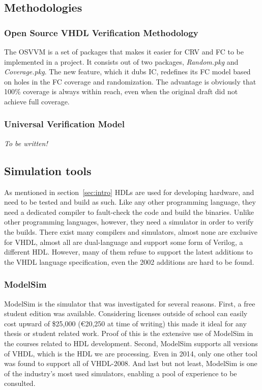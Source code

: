 \documentclass[11pt,british]{article}
\begin{document}
\subsection{Methodologies}

\subsubsection{Open Source VHDL Verification Methodology}
The \gls{OSVVM} is a set of packages that makes it easier for \gls{CRV} and \gls{FC} to be implemented in a project. It consists out of two packages, \emph{Random.pkg} and \emph{Coverage.pkg}. The new feature, which it dubs \gls{IC}, redefines its FC model based on holes in the FC coverage and randomization. The advantage is obviously that 100\% coverage is always within reach, even when the original draft did not achieve full coverage.\cite{ICoverage}

\subsubsection{Universal Verification Model}
\emph{\color{red} To be written!}

\subsection{Simulation tools}
As mentioned in section~\ref{sec:intro} \gls{HDL}s are used for developing hardware, and need to be tested and build as such. Like any other programming language, they need a dedicated compiler to fault-check the code and build the binaries. Unlike other programming languages, however, they need a simulator in order to verify the builds. There exist many compilers and simulators, almost none are exclusive for \gls{VHDL}, almost all are dual-language and support some form of Verilog, a different HDL. However, many of them refuse to support the latest additions to the VHDL language specification, even the 2002 additions are hard to be found.

\label{subsec:simtool}
\subsubsection{ModelSim}
ModelSim is the simulator that was investigated for several reasons. First, a free student edition was available. Considering licenses  outside of school can easily cost upward of \$25,000 (\euro20,250 at time of writing) this made it ideal for any thesis or student related work. Proof of this is the extensive use of ModelSim in the courses related to HDL development. Second, ModelSim supports all versions of \gls{VHDL}, which is the \gls{HDL} we are processing. Even in 2014, only one other tool was found to support all of VHDL-2008. And last but not least, ModelSim is one of the industry's most used simulators, enabling a pool of experience to be consulted.
\end{document}

